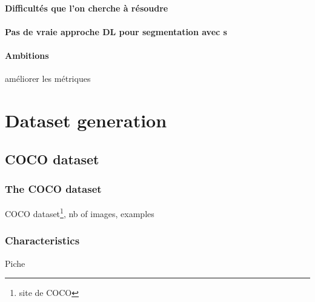 \documentclass{article}
\begin{document}
            \paragraph{Difficultés que l'on cherche à résoudre}
            \paragraph{Pas de vraie approche DL pour segmentation avec \spp s}
            \paragraph{Ambitions}
            améliorer les métriques









\section{Dataset generation}
    \subsection{COCO dataset}
        \subsubsection{The COCO dataset}
        COCO dataset\footnote{site de COCO}, nb of images, examples

        \subsubsection{Characteristics}
        \label{par:charac}
        Piche
\end{document}
